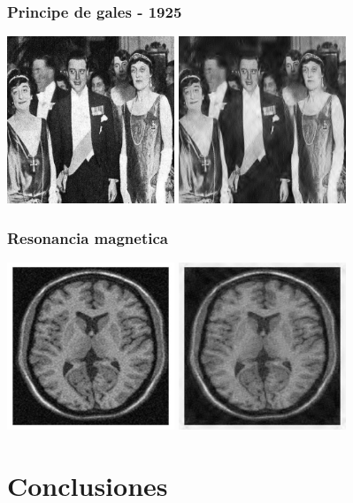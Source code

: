 \documentclass{beamer}
\begin{document}
  \begin{frame}
    \frametitle{Principe de gales - 1925}
    \centering
    \includegraphics[width=5cm]{imgs/Real-resize/1.jpg}
    \includegraphics[width=5cm]{imgs/Real/1.jpg}
   
  \end{frame}

  \begin{frame}
    \frametitle{Resonancia magnetica}
    \centering
    \includegraphics[width=5cm]{imgs/Real-resize/0.jpg}
    \includegraphics[width=5cm]{imgs/Real/0.jpg}  
  \end{frame}

  \section{Conclusiones}
\end{document}
